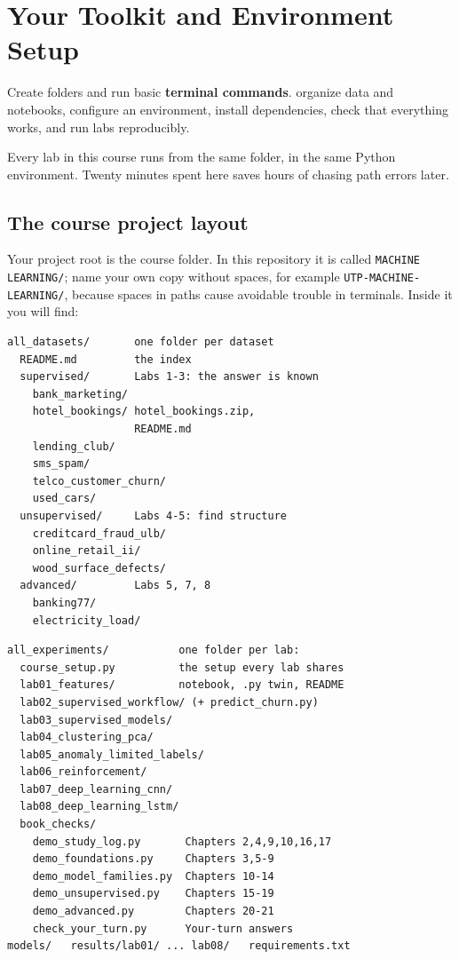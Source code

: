 \chapter{Your Toolkit and Environment Setup}
\label{ch:toolkit}

\chapterguide%
  {Create folders and run basic \textbf{terminal commands}.}
  {organize data and notebooks, configure an environment, install dependencies, check that everything works, and run labs reproducibly.}

Every lab in this course runs from the same folder, in the same Python environment. Twenty minutes spent here saves hours of chasing path errors later.

\section{The course project layout}

Your project root is the course folder. In this repository it is called \texttt{MACHINE LEARNING/}; name your own copy without spaces, for example \texttt{UTP-MACHINE-LEARNING/}, because spaces in paths cause avoidable trouble in terminals. Inside it you will find:

\noindent
\begin{minipage}[t]{0.47\linewidth}
\begin{lstlisting}[style=utpterminal]
all_datasets/       one folder per dataset
  README.md         the index
  supervised/       Labs 1-3: the answer is known
    bank_marketing/
    hotel_bookings/ hotel_bookings.zip,
                    README.md
    lending_club/
    sms_spam/
    telco_customer_churn/
    used_cars/
  unsupervised/     Labs 4-5: find structure
    creditcard_fraud_ulb/
    online_retail_ii/
    wood_surface_defects/
  advanced/         Labs 5, 7, 8
    banking77/
    electricity_load/
\end{lstlisting}
\end{minipage}\hfill
\begin{minipage}[t]{0.51\linewidth}
\begin{lstlisting}[style=utpterminal]
all_experiments/           one folder per lab:
  course_setup.py          the setup every lab shares
  lab01_features/          notebook, .py twin, README
  lab02_supervised_workflow/ (+ predict_churn.py)
  lab03_supervised_models/
  lab04_clustering_pca/
  lab05_anomaly_limited_labels/
  lab06_reinforcement/
  lab07_deep_learning_cnn/
  lab08_deep_learning_lstm/
  book_checks/
    demo_study_log.py       Chapters 2,4,9,10,16,17
    demo_foundations.py     Chapters 3,5-9
    demo_model_families.py  Chapters 10-14
    demo_unsupervised.py    Chapters 15-19
    demo_advanced.py        Chapters 20-21
    check_your_turn.py      Your-turn answers
models/   results/lab01/ ... lab08/   requirements.txt
\end{lstlisting}
\end{minipage}

